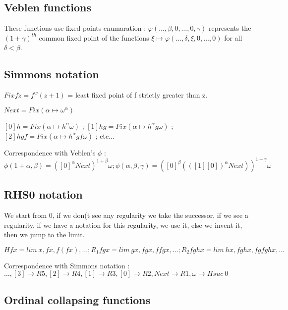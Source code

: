 \documentclass[10pt]{article}
\begin{document}
\subsection{Veblen functions}

These functions use fixed points enumaration : \(\varphi(\ldots,\beta,0,\ldots,0,\gamma) \) represents the \((1+\gamma)^{th}\) common fixed point of the functions \( \xi \mapsto \varphi(\ldots,\delta,\xi,0,\ldots,0)\) for all \(\delta < \beta\).


\subsection{Simmons notation}

\( Fix f z = f^w(z+1)\) = least fixed point of f strictly greater than z.

\( Next = Fix (\alpha \mapsto \omega^\alpha) \) 

\( [0] h = Fix (\alpha \mapsto h^\alpha \omega) \) ;
\( [1] h g = Fix (\alpha \mapsto h^\alpha g \omega) \) ;
\( [2] h g f = Fix (\alpha \mapsto h^\alpha g f \omega) \) ; etc...

Correspondence with Veblen's \(\phi\) : \( \phi(1+\alpha,\beta) = ([0]^\alpha Next)^{1+\beta} \omega ; 
 \phi(\alpha,\beta,\gamma) = ([0]^\beta (([1] [0])^\alpha Next))^{1+\gamma} \omega \)




\subsection{RHS0 notation}

We start from 0, if we don(t see any regularity we take the successor, if we see a regularity, if we have a notation for this regularity, we use it, else we invent it, then we jump to the limit.

\( H f x = lim\ x, f x, f (f x), \ldots ; R_1 f g x = lim\ g x, f g x, f f g x, \ldots ; R_2 f g h x = lim\ h x, f g h x, f g f g h x, \ldots \)

Correspondence with Simmons notation : 
\( \ldots, [3] \rightarrow R5, [2] \rightarrow R4, [1] \rightarrow R3, [0] \rightarrow R2, Next \rightarrow R1, \omega \rightarrow H suc\ 0 \)



\subsection{Ordinal collapsing functions}
\end{document}
